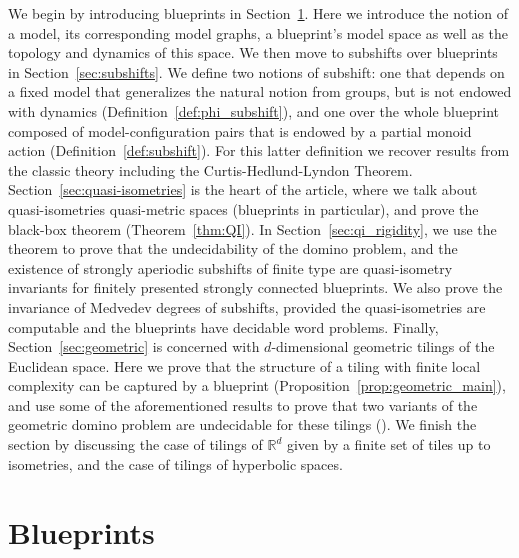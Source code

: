 \documentclass{article}
\theoremstyle{definition}
\theoremstyle{definition}
\newcommand{\RR}{\mathbb{R}}
\newcommand{\todo}[1]{\textcolor{red}{\textnormal{TODO: #1}}}
\begin{document}
We begin by introducing blueprints in Section~\ref{sec:blueprints}. Here we introduce the notion of a model, its corresponding model graphs, a blueprint's model space as well as the topology and dynamics of this space. We then move to subshifts over blueprints in Section~\ref{sec:subshifts}. We define two notions of subshift: one that depends on a fixed model that generalizes the natural notion from groups, but is not endowed with dynamics (Definition~\ref{def:phi_subshift}), and one over the whole blueprint composed of model-configuration pairs that is endowed by a partial monoid action (Definition~\ref{def:subshift}). For this latter definition we recover results from the classic theory including the Curtis-Hedlund-Lyndon Theorem. Section~\ref{sec:quasi-isometries} is the heart of the article, where we talk about quasi-isometries quasi-metric spaces (blueprints in particular), and prove the black-box theorem (Theorem~\ref{thm:QI}). In Section~\ref{sec:qi_rigidity}, we use the theorem to prove that the undecidability of the domino problem, and the existence of strongly aperiodic subshifts of finite type are quasi-isometry invariants for finitely presented strongly connected blueprints. We also prove the invariance of Medvedev degrees of subshifts, provided the quasi-isometries are computable and the blueprints have decidable word problems. Finally, Section~\ref{sec:geometric} is concerned with $d$-dimensional geometric tilings of the Euclidean space. Here we prove that the structure of a tiling with finite local complexity can be captured by a blueprint (Proposition~\ref{prop:geometric_main}), and use some of the aforementioned results to prove that two variants of the geometric domino problem are undecidable for these tilings (). We finish the section by discussing the case of tilings of $\RR^d$ given by a finite set of tiles up to isometries, and the case of tilings of hyperbolic spaces.

%
%
%
%
\section{Blueprints}
\label{sec:blueprints}
\end{document}
